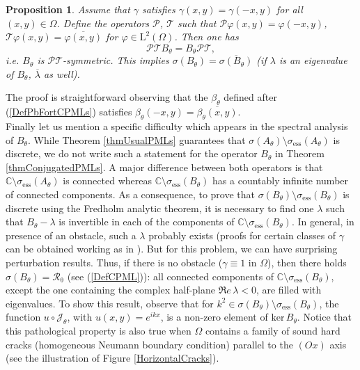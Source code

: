\documentclass[11pt,a4paper]{report}
\newcommand{\Om}{\Omega}
\newcommand{\mrm}[1]{\mathrm{#1}}
\newcommand{\Cplx}{\mathbb{C}}
\newcommand{\mL}{\mrm{L}}
\renewcommand{\ker}{\mrm{ker}}
\newtheorem{proposition}[theorem]{Proposition}
\begin{document}
\begin{proposition}\label{PropositionPTsym}
Assume that $\gamma$ satisfies $\gamma(x,y)=\gamma(-x,y)$ for all $(x,y)\in\Om$. Define the operators $\mathcal{P}$, $\mathcal{T}$ such that $\mathcal{P}\varphi(x,y)=\varphi(-x,y)$, $\mathcal{T}\varphi(x,y)=\overline{\varphi(x,y)}$ for $\varphi\in\mL^2(\Om)$. Then one has
\[
\mathcal{PT}B_{\theta}=B_{\theta}\mathcal{PT},
\]
\textit{i.e.} $B_{\theta}$ is $\mathcal{PT}$-symmetric. This implies $\sigma(B_{\theta})=\overline{\sigma(B_{\theta})}$ (if $\lambda$ is an eigenvalue of $B_{\theta}$, $\overline{\lambda}$ as well).
\end{proposition}
\noindent The proof is straightforward observing that the $\beta_{\theta}$ defined after (\ref{DefPbFortCPMLs}) satisfies $\beta_{\theta}(-x,y)=\overline{\beta_{\theta}(x,y)}$.\\
\newline
Finally let us mention a specific difficulty which appears in the spectral analysis of $B_{\theta}$. While Theorem \ref{thmUsualPMLs} guarantees that $\sigma(A_{\theta})\setminus\sigma_{\mrm{ess}}(A_{\theta})$ is discrete, we do not write such a statement for the operator $B_{\theta}$ in Theorem \ref{thmConjugatedPMLs}. A major difference between both operators is that $\Cplx\setminus \sigma_{\mrm{ess}}(A_{\theta})$ is connected whereas $\Cplx\setminus \sigma_{\mrm{ess}}(B_{\theta})$ has a countably infinite number of connected components. As a consequence, to prove that $\sigma (B_{\theta})\setminus \sigma_{\mrm{ess}}(B_{\theta})$ is discrete using the Fredholm analytic theorem, it is necessary to find one $\lambda$ such that $B_{\theta}-\lambda$ is invertible in each of the components of $\Cplx\setminus \sigma_{\mrm{ess}}(B_{\theta})$. In general, in presence of an obstacle, such a $\lambda$ probably exists (proofs for certain classes of $\gamma$ can be obtained working as in \cite{BoCN15}). But for this problem, we can have surprising perturbation results. Thus, if there is no obstacle ($\gamma\equiv1$ in $\Om$), then there holds $\sigma(B_{\theta})=\mathscr{R}_{\mrm{\theta}}$ (see (\ref{DefCPML})): all connected components of $\Cplx\setminus \sigma_{\mrm{ess}}(B_{\theta})$, except the one containing the  complex half-plane $\Re e\,\lambda<0$, are filled with eigenvalues. 
 To show this result, observe that for $k^2\in\sigma(B_{\theta})\setminus\sigma_{\mrm{ess}}(B_{\theta})$, the function $u\circ \mathcal{J}_{\theta}$, with $u(x,y)=e^{ik x}$, is a non-zero element of $\ker\,B_{\theta}$. Notice that this pathological property is also true when $\Om$ contains a family of sound hard cracks (homogeneous Neumann boundary condition) parallel to the $(Ox)$ axis (see the illustration of Figure \ref{HorizontalCracks}).
\end{document}
